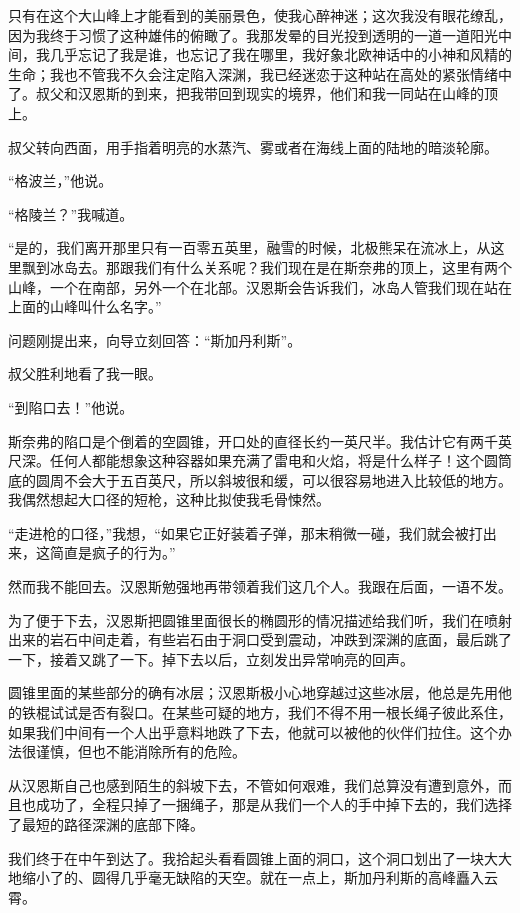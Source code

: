 \documentclass[10pt]{book}
\begin{document}
只有在这个大山峰上才能看到的美丽景色，使我心醉神迷；这次我没有眼花缭乱，因为我终于习惯了这种雄伟的俯瞰了。我那发晕的目光投到透明的一道一道阳光中间，我几乎忘记了我是谁，也忘记了我在哪里，我好象北欧神话中的小神和风精的生命；我也不管我不久会注定陷入深渊，我已经迷恋于这种站在高处的紧张情绪中了。叔父和汉恩斯的到来，把我带回到现实的境界，他们和我一同站在山峰的顶上。

叔父转向西面，用手指着明亮的水蒸汽、雾或者在海线上面的陆地的暗淡轮廓。

“格波兰，”他说。

“格陵兰？”我喊道。

“是的，我们离开那里只有一百零五英里，融雪的时候，北极熊呆在流冰上，从这里飘到冰岛去。那跟我们有什么关系呢？我们现在是在斯奈弗的顶上，这里有两个山峰，一个在南部，另外一个在北部。汉恩斯会告诉我们，冰岛人管我们现在站在上面的山峰叫什么名字。”

问题刚提出来，向导立刻回答：“斯加丹利斯”。

叔父胜利地看了我一眼。

“到陷口去！”他说。

斯奈弗的陷口是个倒着的空圆锥，开口处的直径长约一英尺半。我估计它有两千英尺深。任何人都能想象这种容器如果充满了雷电和火焰，将是什么样子！这个圆筒底的圆周不会大于五百英尺，所以斜坡很和缓，可以很容易地进入比较低的地方。我偶然想起大口径的短枪，这种比拟使我毛骨悚然。

“走进枪的口径，”我想，“如果它正好装着子弹，那末稍微一碰，我们就会被打出来，这简直是疯子的行为。”

然而我不能回去。汉恩斯勉强地再带领着我们这几个人。我跟在后面，一语不发。

为了便于下去，汉恩斯把圆锥里面很长的椭圆形的情况描述给我们听，我们在喷射出来的岩石中间走着，有些岩石由于洞口受到震动，冲跌到深渊的底面，最后跳了一下，接着又跳了一下。掉下去以后，立刻发出异常响亮的回声。

圆锥里面的某些部分的确有冰层；汉恩斯极小心地穿越过这些冰层，他总是先用他的铁棍试试是否有裂口。在某些可疑的地方，我们不得不用一根长绳子彼此系住，如果我们中间有一个人出乎意料地跌了下去，他就可以被他的伙伴们拉住。这个办法很谨慎，但也不能消除所有的危险。

从汉恩斯自己也感到陌生的斜坡下去，不管如何艰难，我们总算没有遭到意外，而且也成功了，全程只掉了一捆绳子，那是从我们一个人的手中掉下去的，我们选择了最短的路径深渊的底部下降。

我们终于在中午到达了。我拾起头看看圆锥上面的洞口，这个洞口划出了一块大大地缩小了的、圆得几乎毫无缺陷的天空。就在一点上，斯加丹利斯的高峰矗入云霄。
\end{document}
